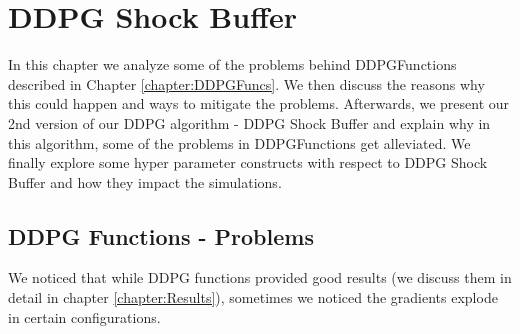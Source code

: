 \makeatletter
\newenvironment{breakablealgorithm}
  {%
   \begin{center}
     \refstepcounter{algorithm}%
     \hrule height.8pt depth0pt \kern2pt%
     \renewcommand{\caption}[2][\relax]{%
       {\raggedright\textbf{\ALG@name~\thealgorithm} ##2\par}%
       \ifx\relax##1\relax %
         \addcontentsline{loa}{algorithm}{\protect\numberline{\thealgorithm}##2}%
       \else %
         \addcontentsline{loa}{algorithm}{\protect\numberline{\thealgorithm}##1}%
       \fi
       \kern2pt\hrule\kern2pt
     }
  }{%
     \kern2pt\hrule\relax%
   \end{center}
  }
\makeatother
\chapter{DDPG Shock Buffer}\label{chapter:ShockBuffer}
In this chapter we analyze some of the problems behind DDPGFunctions described in Chapter \ref{chapter:DDPGFuncs}. We then discuss the reasons why this could happen and ways to mitigate the problems. Afterwards, we present our 2nd version of our DDPG algorithm - DDPG Shock Buffer and explain why in this algorithm, some of the problems in DDPGFunctions get alleviated. We finally explore some hyper parameter constructs with respect to DDPG Shock Buffer and how they impact the simulations.

\section{DDPG Functions - Problems}

We noticed that while DDPG functions provided good results (we discuss them in detail in chapter \ref{chapter:Results}), sometimes we noticed the gradients explode in certain configurations. 

